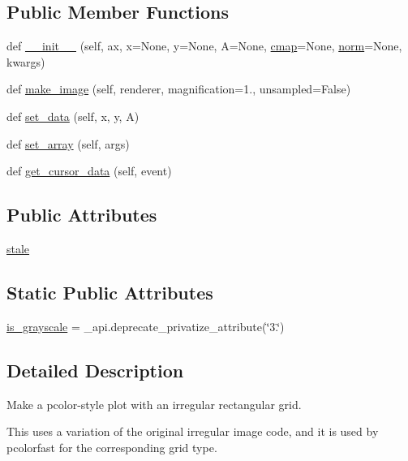 \subsection*{Public Member Functions}
\begin{DoxyCompactItemize}
\item 
def \hyperlink{classmatplotlib_1_1image_1_1PcolorImage_a88e5b79e41ec15edef12dc46d3be3187}{\+\_\+\+\_\+init\+\_\+\+\_\+} (self, ax, x=None, y=None, A=None, \hyperlink{classmatplotlib_1_1cm_1_1ScalarMappable_a3684ebc12a81cc6f2599c0babd1d40af}{cmap}=None, \hyperlink{classmatplotlib_1_1cm_1_1ScalarMappable_a5507985e8c38feaa3d6972f75db09f73}{norm}=None, kwargs)
\item 
def \hyperlink{classmatplotlib_1_1image_1_1PcolorImage_a221c4c4a43814566ca0cd5ae8a068bc3}{make\+\_\+image} (self, renderer, magnification=1., unsampled=False)
\item 
def \hyperlink{classmatplotlib_1_1image_1_1PcolorImage_add0f07a055acd14f51d46dc7924de64c}{set\+\_\+data} (self, x, y, A)
\item 
def \hyperlink{classmatplotlib_1_1image_1_1PcolorImage_a57e5e9df73f4094aa1583a307f3f1859}{set\+\_\+array} (self, args)
\item 
def \hyperlink{classmatplotlib_1_1image_1_1PcolorImage_accbbf6a4d94bb249820a80d93aa3300c}{get\+\_\+cursor\+\_\+data} (self, event)
\end{DoxyCompactItemize}
\subsection*{Public Attributes}
\begin{DoxyCompactItemize}
\item 
\hyperlink{classmatplotlib_1_1image_1_1PcolorImage_a4932fc2a2e98f699033a0f74246c68cf}{stale}
\end{DoxyCompactItemize}
\subsection*{Static Public Attributes}
\begin{DoxyCompactItemize}
\item 
\hyperlink{classmatplotlib_1_1image_1_1PcolorImage_a4b2984e4cdcbd9b19259f47723f83804}{is\+\_\+grayscale} = \+\_\+api.\+deprecate\+\_\+privatize\+\_\+attribute(\char`\"{}3.\char`\"{})
\end{DoxyCompactItemize}


\subsection{Detailed Description}
\begin{DoxyVerb}Make a pcolor-style plot with an irregular rectangular grid.

This uses a variation of the original irregular image code,
and it is used by pcolorfast for the corresponding grid type.
\end{DoxyVerb}
 

